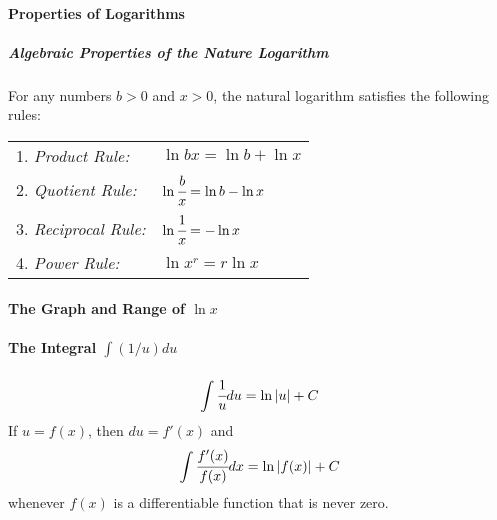 \documentclass{article}
\begin{document}
            \paragraph{Properties of Logarithms}
                    \subparagraph{Algebraic Properties of the Nature Logarithm} For any numbers $b>0$ and $x>0$, the natural logarithm satisfies the following rules:\\\par
                    \begin{tabular}{|ll|}
                        \hline
                        1. \textit{Product Rule:}&$\ln bx=\ln b+\ln x$\\
                        2. \textit{Quotient Rule:}&$\ln \cfrac{b}{x}=\ln b-\ln x$\\
                        3. \textit{Reciprocal Rule:}&$\ln \cfrac{1}{x}=-\ln x$\\
                        4. \textit{Power Rule:}&$\ln x^r=r\ln x$\\
                        \hline
                    \end{tabular}
            \paragraph{The Graph and Range of $\ln x$}
            \paragraph{The Integral $\int(1/u)du$}
                \[\int \cfrac{1}{u}du=\ln |u|+C\]
                If $u=f(x)$, then $du=f'(x)$ and
                \[\int \cfrac{f'(x)}{f(x)}dx=\ln |f(x)|+C\]
                whenever $f(x)$ is a differentiable function that is never zero.
\end{document}
